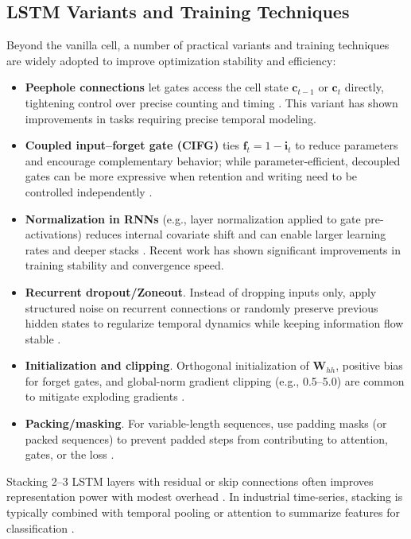 \subsection{LSTM Variants and Training Techniques}
Beyond the vanilla cell, a number of practical variants and training techniques are widely adopted to improve optimization stability and efficiency:
\begin{itemize}
    \item \textbf{Peephole connections} let gates access the cell state \(\mathbf{c}_{t-1}\) or \(\mathbf{c}_t\) directly, tightening control over precise counting and timing \citep{gers2000learning}. This variant has shown improvements in tasks requiring precise temporal modeling.
    \item \textbf{Coupled input–forget gate (CIFG)} ties \(\mathbf{f}_t = 1-\mathbf{i}_t\) to reduce parameters and encourage complementary behavior; while parameter-efficient, decoupled gates can be more expressive when retention and writing need to be controlled independently \citep{greff2017lstm}.
    \item \textbf{Normalization in RNNs} (e.g., layer normalization applied to gate pre-activations) reduces internal covariate shift and can enable larger learning rates and deeper stacks \citep{ba2016layer}. Recent work has shown significant improvements in training stability and convergence speed.
    \item \textbf{Recurrent dropout/Zoneout}. Instead of dropping inputs only, apply structured noise on recurrent connections or randomly preserve previous hidden states to regularize temporal dynamics while keeping information flow stable \citep{krueger2017zoneout, semeniuta2016recurrent}.
    \item \textbf{Initialization and clipping}. Orthogonal initialization of \(\mathbf{W}_{hh}\), positive bias for forget gates, and global-norm gradient clipping (e.g., 0.5--5.0) are common to mitigate exploding gradients \citep{pascanu2013difficulty, jozefowicz2015empirical}.
    \item \textbf{Packing/masking}. For variable-length sequences, use padding masks (or packed sequences) to prevent padded steps from contributing to attention, gates, or the loss \citep{goodfellow2016deep}.
\end{itemize}
Stacking 2--3 LSTM layers with residual or skip connections often improves representation power with modest overhead \citep{he2016deep}. In industrial time-series, stacking is typically combined with temporal pooling or attention to summarize features for classification \citep{zhao2019deep}.

